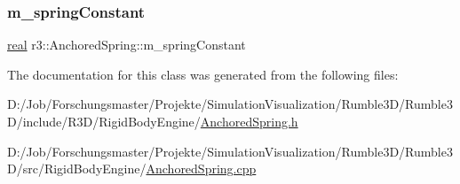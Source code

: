 \mbox{\label{classr3_1_1_anchored_spring_af17c024b5f8a025f5555946c60b52a67}} 
\subsubsection{\texorpdfstring{m\+\_\+spring\+Constant}{m\_springConstant}}
{\footnotesize\ttfamily \mbox{\hyperlink{namespacer3_ab2016b3e3f743fb735afce242f0dc1eb}{real}} r3\+::\+Anchored\+Spring\+::m\+\_\+spring\+Constant\hspace{0.3cm}{\ttfamily [protected]}}



The documentation for this class was generated from the following files\+:\begin{DoxyCompactItemize}
\item 
D\+:/\+Job/\+Forschungsmaster/\+Projekte/\+Simulation\+Visualization/\+Rumble3\+D/\+Rumble3\+D/include/\+R3\+D/\+Rigid\+Body\+Engine/\mbox{\hyperlink{_anchored_spring_8h}{Anchored\+Spring.\+h}}\item 
D\+:/\+Job/\+Forschungsmaster/\+Projekte/\+Simulation\+Visualization/\+Rumble3\+D/\+Rumble3\+D/src/\+Rigid\+Body\+Engine/\mbox{\hyperlink{_anchored_spring_8cpp}{Anchored\+Spring.\+cpp}}\end{DoxyCompactItemize}
